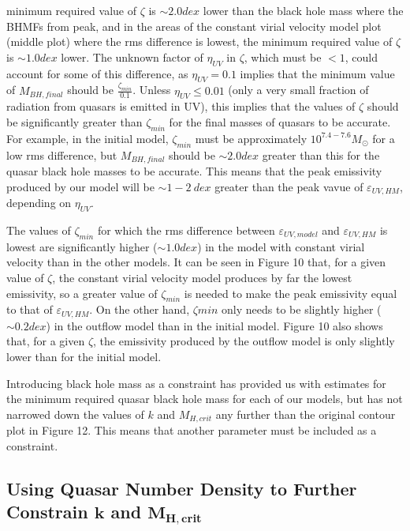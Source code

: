 \documentclass[12pt, twocolumn]{article}%
\begin{document}
\noindent minimum required value of $\zeta$ is $\sim2.0dex$ lower than the black hole mass where the BHMFs from \citeauthor{BH_mass_fns} peak, and in the areas of the constant virial velocity model plot (middle plot) where the rms difference is lowest, the minimum required value of $\zeta$ is $\sim1.0dex$ lower. The unknown factor of $\eta_{UV}$ in $\zeta$, which must be $<1$, could account for some of this difference, as $\eta_{UV}=0.1$ implies that the minimum value of $M_{BH,final}$ should be $\frac{\zeta_{min}}{0.1}$. Unless $\eta_{UV}\leq0.01$ (only a very small fraction of radiation from quasars is emitted in UV), this implies that the values of $\zeta$ should be significantly greater than $\zeta_{min}$ for the final masses of quasars to be accurate. For example, in the initial model, $\zeta_{min}$ must be approximately $10^{7.4-7.6}M_\odot$ for a low rms difference, but $M_{BH,final}$ should be $\sim2.0dex$ greater than this for the quasar black hole masses to be accurate. This means that the peak emissivity produced by our model will be $\sim1-2\:dex$ greater than the peak vavue of $\varepsilon_{UV,HM}$, depending on $\eta_{UV}$.\par

The values of $\zeta_{min}$ for which the rms difference between $\varepsilon_{UV,model}$ and $\varepsilon_{UV,HM}$ is lowest are significantly higher ($\sim1.0dex$) in the model with constant virial velocity than in the other models. It can be seen in Figure 10 that, for a given value of $\zeta$, the constant virial velocity model produces by far the lowest emissivity, so a greater value of $\zeta_{min}$ is needed to make the peak emissivity equal to that of $\varepsilon_{UV,HM}$. On the other hand, $\zeta{min}$ only needs to be slightly higher ($\sim0.2dex$) in the outflow model than in the initial model. Figure 10 also shows that, for a given $\zeta$, the emissivity produced by the outflow model is only slightly lower than for the initial model.\par

Introducing black hole mass as a constraint has provided us with estimates for the minimum required quasar black hole mass for each of our models, but has not narrowed down the values of $k$ and $M_{H,crit}$ any further than the original contour plot in Figure 12. This means that another parameter must be included as a constraint.

\subsection{Using Quasar Number Density to Further Constrain $\bm{k}$ and $\bm{M_{H,crit}}$}
\end{document}
